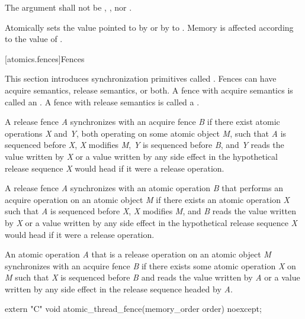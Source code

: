 \begin{itemdescr}
\pnum
\requires The  argument shall not be ,
, nor .

\pnum
\effects Atomically sets the value pointed to by  or by  to
. Memory is affected according to the value of .
\end{itemdescr}

[atomics.fences]{Fences}

\pnum
This section introduces synchronization primitives called . Fences can have
acquire semantics, release semantics, or both. A fence with acquire semantics is called
an . A fence with release semantics is called a .

\pnum
A release fence \textit{A} synchronizes with an acquire fence \textit{B} if there exist
atomic operations \textit{X} and \textit{Y}, both operating on some atomic object
\textit{M}, such that \textit{A} is sequenced before \textit{X}, \textit{X} modifies
\textit{M}, \textit{Y} is sequenced before \textit{B}, and \textit{Y} reads the value
written by \textit{X} or a value written by any side effect in the hypothetical release
sequence \textit{X} would head if it were a release operation.

\pnum
A release fence \textit{A} synchronizes with an atomic operation \textit{B} that
performs an acquire operation on an atomic object \textit{M} if there exists an atomic
operation \textit{X} such that \textit{A} is sequenced before \textit{X}, \textit{X}
modifies \textit{M}, and \textit{B} reads the value written by \textit{X} or a value
written by any side effect in the hypothetical release sequence \textit{X} would head if
it were a release operation.

\pnum
An atomic operation \textit{A} that is a release operation on an atomic object
\textit{M} synchronizes with an acquire fence \textit{B} if there exists some atomic
operation \textit{X} on \textit{M} such that \textit{X} is sequenced before \textit{B}
and reads the value written by \textit{A} or a value written by any side effect in the
release sequence headed by \textit{A}.

%
\begin{itemdecl}
extern "C" void atomic_thread_fence(memory_order order) noexcept;
\end{itemdecl}


